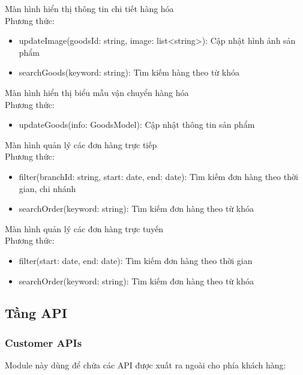 Màn hình hiển thị thông tin chi tiết hàng hóa\\
Phương thức:
\begin{itemize}
	\item updateImage(goodsId: string, image: list<string>): Cập nhật hình ảnh sản phẩm
	\item searchGoods(keyword: string): Tìm kiếm hàng theo từ khóa
\end{itemize}

Màn hình hiển thị biểu mẫu vận chuyển hàng hóa\\
Phương thức:
\begin{itemize}
	\item updateGoods(info: GoodsModel): Cập nhật thông tin sản phẩm
\end{itemize}

Màn hình quản lý các đơn hàng trực tiếp\\
Phương thức:
\begin{itemize}
	\item filter(branchId: string, start: date, end: date): Tìm kiếm đơn hàng theo thời gian, chi nhánh
	\item searchOrder(keyword: string): Tìm kiếm đơn hàng theo từ khóa
\end{itemize}

Màn hình quản lý các đơn hàng trực tuyến\\
Phương thức:
\begin{itemize}
	\item filter(start: date, end: date): Tìm kiếm đơn hàng theo thời gian
	\item searchOrder(keyword: string): Tìm kiếm đơn hàng theo từ khóa
\end{itemize}



\subsection{Tầng API}
\subsubsection{Customer APIs}
Module này dùng để chứa các API được xuất ra ngoài cho phía khách hàng:

